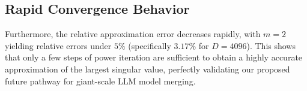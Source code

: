\documentclass{article}
\theoremstyle{plain}
\theoremstyle{definition}
\theoremstyle{remark}
\begin{document}
\subsection{Rapid Convergence Behavior}
Furthermore, the relative approximation error decreases rapidly, with $m = 2$ yielding relative errors under $5\%$ (specifically $3.17\%$ for $D=4096$). This shows that only a few steps of power iteration are sufficient to obtain a highly accurate approximation of the largest singular value, perfectly validating our proposed future pathway for giant-scale LLM model merging.
\end{document}
